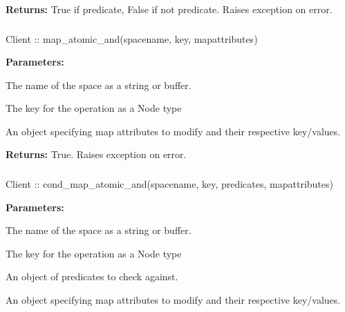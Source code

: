 \noindent\textbf{Returns:}
True if predicate, False if not predicate.  Raises exception on error.

\subsubsection{}
\label{api:nodejs:map_atomic_and}
\begin{javascriptcode}
Client :: map_atomic_and(spacename, key, mapattributes)
\end{javascriptcode}
\funcdesc 

\noindent\textbf{Parameters:}
\begin{description}[labelindent=\widthof{{\code{mapattributes}}},leftmargin=*,noitemsep,nolistsep,align=right]
\item[\code{spacename}] The name of the space as a string or buffer.
\item[\code{key}] The key for the operation as a Node type
\item[\code{mapattributes}] An object specifying map attributes to modify and their respective key/values.
\end{description}

\noindent\textbf{Returns:}
True.  Raises exception on error.

\subsubsection{}
\label{api:nodejs:cond_map_atomic_and}
\begin{javascriptcode}
Client :: cond_map_atomic_and(spacename, key, predicates, mapattributes)
\end{javascriptcode}
\funcdesc 

\noindent\textbf{Parameters:}
\begin{description}[labelindent=\widthof{{\code{mapattributes}}},leftmargin=*,noitemsep,nolistsep,align=right]
\item[\code{spacename}] The name of the space as a string or buffer.
\item[\code{key}] The key for the operation as a Node type
\item[\code{predicates}] An object of predicates to check against.
\item[\code{mapattributes}] An object specifying map attributes to modify and their respective key/values.
\end{description}

